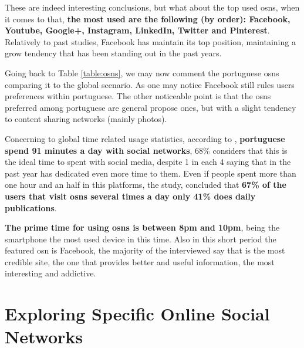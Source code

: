 \indent These are indeed interesting conclusions, but what about the top used \glspl{osn}, when it comes to that, \textbf{the most used are
the following (by order): Facebook, Youtube, Google+, Instagram, LinkedIn, Twitter and Pinterest}.\\
\indent Relatively to \cite{marktest2016} past studies, Facebook has maintain
its top position, maintaining a grow tendency that has been standing out in the past years.

\indent Going back to Table \ref{table:osns}, we may now comment the portuguese \glspl{osn} comparing it
to the global scenario. As one may notice Facebook still rules users preferences within portuguese.
The other noticeable point is that the \glspl{osn} preferred among portuguese are general propose ones,
but with a slight tendency to content sharing networks (mainly photos).

\indent Concerning to global time related usage statistics, according to \cite{marktest2016}, \textbf{portuguese spend 91 minutes a day with social networks},
68\% considers that this is the ideal time to spent with social media, despite 1 in each 4 saying that in the past year has dedicated even more time to them.
Even if people spent more than one hour and an half in this platforms, the study,
 concluded that \textbf{67\% of the users that visit \glspl{osn} several times a day only 41\% does daily publications}.

\indent \textbf{The prime time for using \glspl{osn} is between 8pm and 10pm}, being the smartphone the most used device in this time. Also in this short period the
featured \gls{osn} is Facebook, the majority of the interviewed say that is the most credible site, the one that provides better and useful information,
the most interesting and addictive.


\section{Exploring Specific Online Social Networks}

